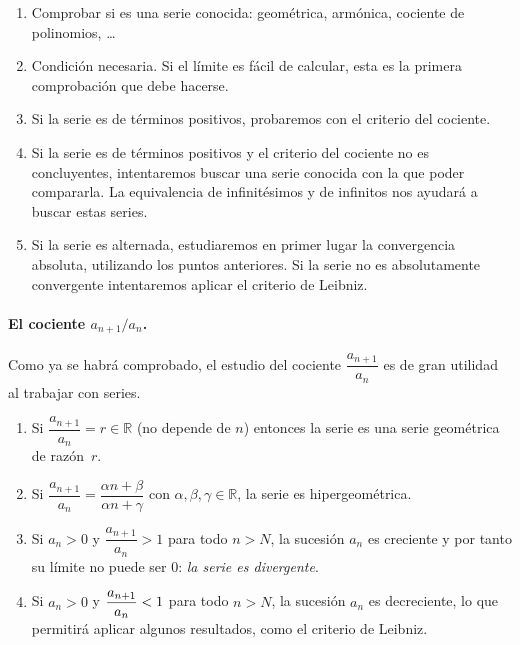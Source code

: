 \begin{enumerate}
\item
Comprobar si es una serie conocida: geométrica, armónica,
cociente de polinomios, \dots

\item
Condición necesaria. Si el límite es fácil de calcular, esta es la primera comprobación que debe hacerse.

\item
Si la serie es de términos positivos, probaremos con el criterio del cociente.


\item
Si la serie es de términos positivos y el criterio del cociente no es concluyentes, intentaremos buscar una serie conocida con la que poder compararla.
La equivalencia de infinitésimos y de infinitos nos ayudará a buscar estas series.

\item
Si la serie es alternada, estudiaremos en primer lugar la convergencia absoluta, utilizando los puntos anteriores.
Si la serie no es absolutamente convergente intentaremos aplicar el criterio de Leibniz.

\end{enumerate}

\paragraph{El cociente $a_{n+1}/a_n$.}
Como ya se habrá comprobado, el estudio del cociente $\dfrac{a_{n+1}}{a_n}$ es de gran
utilidad al trabajar con  series.
\begin{enumerate}
\item Si $\dfrac{a_{n+1}}{a_n}=r\in\mathbb{R}$ (no depende de $n$) entonces la serie es una
serie geométrica de razón~$r$.
\item Si $\dfrac{a_{n+1}}{a_n}=\dfrac{\alpha n+\beta}{\alpha
n+\gamma}$ con $\alpha ,\beta ,\gamma\in\mathbb{R}$, la serie es
hipergeométrica. 
\item Si $a_n>0$ y $\dfrac{a_{n+1}}{a_n}>1$ para todo $n>N$, la
sucesión $a_n$ es creciente y por tanto su límite no puede
ser 0: \emph{la serie es divergente}.
\item Si $a_n>0$ y $\dfrac{a_{n+1}}{a_n}< 1$ para todo $n>N$, la
sucesión $a_n$ es decreciente, lo que permitirá aplicar algunos resultados, como el criterio de Leibniz.
\end{enumerate}

